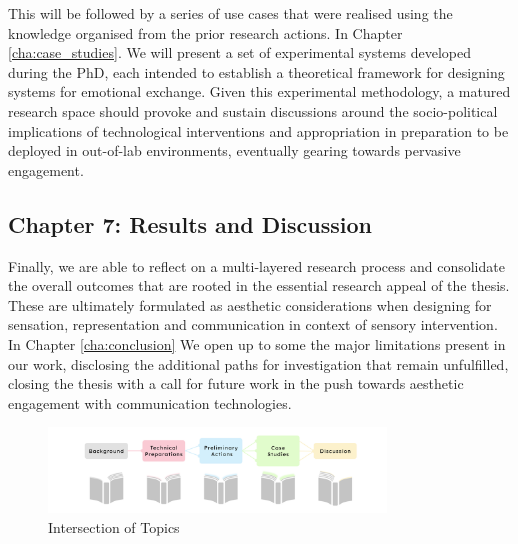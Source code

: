 This will be followed by a series of use cases that were realised using the knowledge organised from the prior research actions. In Chapter \ref{cha:case_studies}. We will present a set of experimental systems developed during the PhD, each intended to establish a theoretical framework for designing systems for emotional exchange. Given this experimental methodology, a matured research space should provoke and sustain discussions around the socio-political implications of technological interventions and appropriation in preparation to be deployed in out-of-lab environments, eventually gearing towards pervasive engagement.

\subsection{Chapter 7: Results and Discussion}

Finally, we are able to reflect on a multi-layered research process and consolidate the overall outcomes that are rooted in the essential research appeal of the thesis. These are ultimately formulated as aesthetic considerations when designing for sensation, representation and communication in context of sensory intervention. In Chapter \ref{cha:conclusion} We open up to some the major limitations present in our work, disclosing the additional paths for investigation that remain unfulfilled, closing the thesis with a call for future work in the push towards aesthetic engagement with communication technologies.

\begin{figure}[htbp]
	\centering
	\includegraphics[width=0.8\textwidth]{Chapters/Figures/background/Sec1_Thesis_Structure.svg}
	\caption{Intersection of Topics}
	\label{fig:Concept_Venn}
\end{figure}

